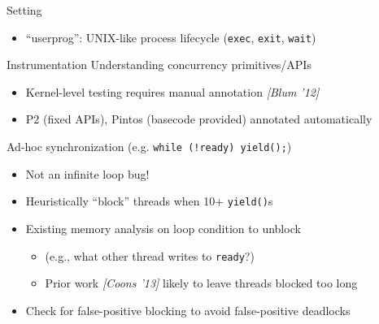 \documentclass[xcolor=dvipsnames]{beamer}
\begin{document}
\begin{frame}{Setting}
\begin{itemize}
\begin{itemize}
			\item ``userprog'': UNIX-like process lifecycle
				({\tt exec}, %
				{\tt exit}, {\tt wait})
		\end{itemize}
	\end{itemize}
\end{frame}

\begin{frame}{Instrumentation}
	Understanding concurrency primitives/APIs
	\begin{itemize}
		\item Kernel-level testing requires manual annotation {\em [Blum '12]}
		\item P2 (fixed APIs), Pintos (basecode provided) annotated automatically
	\end{itemize}
	\pause
	\linegap

	Ad-hoc synchronization (e.g. {\tt while (!ready) yield();})
	\begin{itemize}
		\item Not an infinite loop bug!
		\item Heuristically ``block'' threads when 10+ {\tt yield()}s %
		\item Existing memory analysis %
			on loop condition to unblock
			\begin{itemize}
				\item (e.g., what other thread writes to {\tt ready}?)
				\item Prior work {\em [Coons '13]} likely to leave threads blocked too long
			\end{itemize}
		\item Check for false-positive blocking to avoid false-positive deadlocks
	\end{itemize}



\end{frame}
\end{document}
